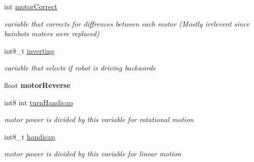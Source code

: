 \begin{DoxyCompactItemize}
\item 
\mbox{\label{class_omni_drive_conrtoller_a0a78c1214005e227761e651657e66200}} 
int \mbox{\hyperlink{class_omni_drive_conrtoller_a0a78c1214005e227761e651657e66200}{motor\+Correct}}
\begin{DoxyCompactList}\small\item\em variable that corrects for diffrences between each motor (Mostly irrlevent since bainbots moters were replaced) \end{DoxyCompactList}\item 
\mbox{\label{class_omni_drive_conrtoller_af911b890cd2e146b211c0e7c4b53fc86}} 
int8\+\_\+t \mbox{\hyperlink{class_omni_drive_conrtoller_af911b890cd2e146b211c0e7c4b53fc86}{inverting}}
\begin{DoxyCompactList}\small\item\em variable that selects if robot is driving backwords \end{DoxyCompactList}\item 
\mbox{\label{class_omni_drive_conrtoller_a03baba5698664886fece7c2bc1acd81b}} 
float {\bfseries motor\+Reverse}
\item 
\mbox{\label{class_omni_drive_conrtoller_ac06677eaf663dafb06fec88cc7ca36a3}} 
int8 int \mbox{\hyperlink{class_omni_drive_conrtoller_ac06677eaf663dafb06fec88cc7ca36a3}{turn\+Handicap}}
\begin{DoxyCompactList}\small\item\em motor power is divided by this variable for rotational motion \end{DoxyCompactList}\item 
\mbox{\label{class_omni_drive_conrtoller_af9a59405abbb827a1ab9934561c0004d}} 
int8\+\_\+t \mbox{\hyperlink{class_omni_drive_conrtoller_af9a59405abbb827a1ab9934561c0004d}{handicap}}
\begin{DoxyCompactList}\small\item\em motor power is divided by this variable for linear motion \end{DoxyCompactList}\item 
\mbox{\label{class_omni_drive_conrtoller_a8386f67e9931ac191335c14c4b56bbda}} 

\end{DoxyCompactItemize}
